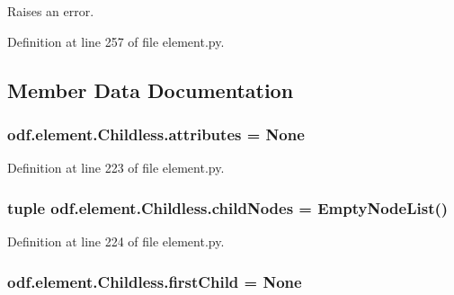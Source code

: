 Raises an error. 



Definition at line 257 of file element.\+py.



\subsection{Member Data Documentation}
\hypertarget{classodf_1_1element_1_1Childless_a974831eaa784b87dd106703dc26cf5a7}{
\subsubsection[{attributes}]{\setlength{\rightskip}{0pt plus 5cm}odf.\+element.\+Childless.\+attributes = None\hspace{0.3cm}{\ttfamily [static]}}}\label{classodf_1_1element_1_1Childless_a974831eaa784b87dd106703dc26cf5a7}


Definition at line 223 of file element.\+py.

\hypertarget{classodf_1_1element_1_1Childless_ae9ed4266fb5a1ee7130cac60657b59e9}{
\subsubsection[{child\+Nodes}]{\setlength{\rightskip}{0pt plus 5cm}tuple odf.\+element.\+Childless.\+child\+Nodes = Empty\+Node\+List()\hspace{0.3cm}{\ttfamily [static]}}}\label{classodf_1_1element_1_1Childless_ae9ed4266fb5a1ee7130cac60657b59e9}


Definition at line 224 of file element.\+py.

\hypertarget{classodf_1_1element_1_1Childless_aadc41dd016ecd19cd96232e5309b17f3}{
\subsubsection[{first\+Child}]{\setlength{\rightskip}{0pt plus 5cm}odf.\+element.\+Childless.\+first\+Child = None\hspace{0.3cm}{\ttfamily [static]}}}\label{classodf_1_1element_1_1Childless_aadc41dd016ecd19cd96232e5309b17f3}


